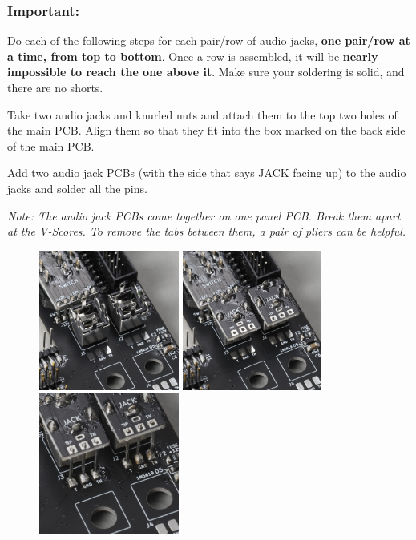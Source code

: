 \documentclass[12pt, a4paper]{article}
\begin{document}
\vspace{-5mm}
{
    \color{red}
    \subsubsection*{Important:}
    \vspace{-3mm}
    Do each of the following steps for each pair/row of audio jacks, \textbf{one pair/row at a
    time, from top to bottom}. Once a row is assembled, it will be \textbf{nearly impossible
    to reach the one above it}. Make sure your soldering is solid, and there are no shorts.
    \vspace{5mm}
}

Take two audio jacks and knurled nuts and attach them to the top two holes of the main PCB.
Align them so that they fit into the box marked on the back side of the main PCB.

Add two audio jack PCBs (with the side that says JACK facing up) to the audio jacks and solder
all the pins.

\textit{%
    Note: The audio jack PCBs come together on one panel PCB. Break them apart at the V-Scores.
    To remove the tabs between them, a pair of pliers can be helpful.
}

\begin{figure}[H]
    \centering
    \includegraphics[width=46mm]{images/32_01_jacks_mounted.jpg}
    \hspace{2mm}
    \includegraphics[width=46mm]{images/32_02_jacks_pcbs_soldered.jpg}
    \hspace{2mm}
    \includegraphics[width=46mm]{images/32_03_jacks_wire_soldered_bottom.jpg}
\end{figure}
\end{document}

